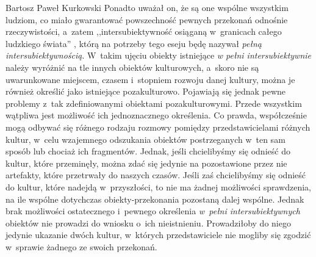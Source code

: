 \begin{artplenv}{Bartosz Paweł Kurkowski}
Ponadto uważał on, że są
one wspólne wszystkim ludziom, co miało gwarantować powszechność pewnych przekonań odnośnie rzeczywistości, a~zatem
,,intersubiektywność osiąganą w~granicach całego ludzkiego świata''
\parencite[s.~389]{zboron_podzial_2014},
którą na potrzeby tego eseju będę nazywał \textit{pełną intersubiektywnością}. W~takim ujęciu obiekty istniejące
\textit{w pełni intersubiektywnie} należy wyróżnić na tle innych obiektów kulturowych, a~skoro nie są uwarunkowane
miejscem, czasem i~stopniem rozwoju danej kultury, można je również określić jako istniejące pozakulturowo. Pojawiają
się jednak pewne problemy z~tak zdefiniowanymi obiektami pozakulturowymi. Przede wszystkim wątpliwa jest możliwość ich
jednoznacznego określenia. Co prawda, współcześnie mogą odbywać się różnego rodzaju rozmowy pomiędzy przedstawicielami
różnych kultur, w~celu wzajemnego odszukania obiektów postrzeganych w~ten sam sposób lub chociaż ich fragmentów.
Jednak, jeśli chcielibyśmy się odnieść do kultur, które przeminęły, można zdać się jedynie na pozostawione przez nie
artefakty, które przetrwały do naszych czasów. Jeśli zaś chcielibyśmy się odnieść do kultur, które
nadejdą w~przyszłości, to nie ma żadnej możliwości sprawdzenia, na ile wspólne dotychczas obiekty-przekonania pozostaną dalej
wspólne. Jednak brak możliwości ostatecznego i~pewnego określenia \textit{w~pełni intersubiektywnych} obiektów nie
prowadzi do wniosku o~ich nieistnieniu. Prowadziłoby do niego jedynie ukazanie dwóch kultur, w~których przedstawiciele
nie mogliby się zgodzić w~sprawie żadnego ze swoich przekonań.



\end{artplenv}
